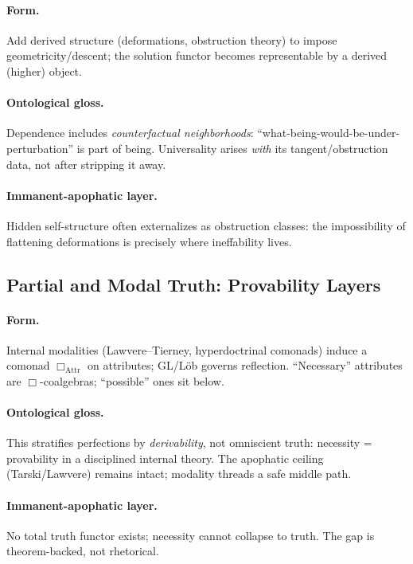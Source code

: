 \documentclass[11pt]{article}
\theoremstyle{upright}
\begin{document}
\paragraph{Form.} 
Add derived structure (deformations, obstruction theory) to impose geometricity/descent; the solution functor becomes representable by a derived (higher) object. \citep{ToenVezzosiHAG}

\paragraph{Ontological gloss.}
Dependence includes \emph{counterfactual neighborhoods}: ``what-being-would-be-under-perturbation'' is part of being. Universality arises \emph{with} its tangent/obstruction data, not after stripping it away.

\paragraph{Immanent-apophatic layer.}
Hidden self-structure often externalizes as obstruction classes: the impossibility of flattening deformations is precisely where ineffability lives.

\subsection{Partial and Modal Truth: Provability Layers}\label{subsec:modal}
\paragraph{Form.}
Internal modalities (Lawvere--Tierney, hyperdoctrinal comonads) induce a comonad $\Box_{\mathrm{Attr}}$ on attributes; GL/Löb governs reflection. ``Necessary'' attributes are $\Box$-coalgebras; ``possible'' ones sit below. \citep{Lawvere1971Quantifiers}

\paragraph{Ontological gloss.}
This stratifies perfections by \emph{derivability}, not omniscient truth: necessity = provability in a disciplined internal theory. The apophatic ceiling (Tarski/Lawvere) remains intact; modality threads a safe middle path.

\paragraph{Immanent-apophatic layer.}
No total truth functor exists; necessity cannot collapse to truth. The gap is theorem-backed, not rhetorical.
\end{document}
